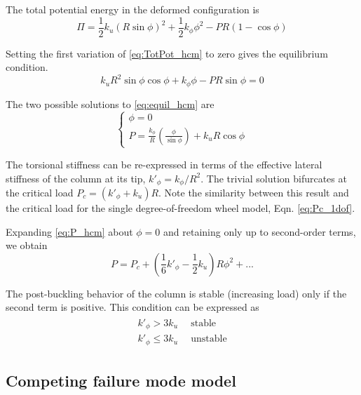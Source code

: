 \documentclass[\rootdir/thesis.tex]{subfiles}
\begin{document}
The total potential energy in the deformed configuration is
\begin{equation}
\label{eq:TotPot_hcm}
\Pi = \frac{1}{2}k_u(R\sin{\phi})^2 + \frac{1}{2}k_{\phi}\phi^2
    - PR(1-\cos{\phi})
\end{equation}

Setting the first variation of \eqref{eq:TotPot_hcm} to zero gives the equilibrium condition.
\begin{equation}
\label{eq:equil_hcm}
k_u R^2 \sin{\phi}\cos{\phi} + k_{\phi}\phi - PR\sin{\phi} = 0
\end{equation}

The two possible solutions to \eqref{eq:equil_hcm} are
\begin{equation}
\label{eq:P_hcm}
\begin{cases}
\phi = 0\\
P = \frac{k_{\phi}}{R}\left(\frac{\phi}{\sin{\phi}}\right) + k_u R\cos{\phi}
\end{cases}
\end{equation}

The torsional stiffness can be re-expressed in terms of the effective lateral stiffness of the column at its tip, $k'_{\phi}=k_{\phi}/R^2$. The trivial solution bifurcates at the critical load $P_c=(k'_{\phi} + k_u) R$. Note the similarity between this result and the critical load for the single degree-of-freedom wheel model, Eqn. \eqref{eq:Pc_1dof}.

Expanding \eqref{eq:P_hcm} about $\phi=0$ and retaining only up to second-order terms, we obtain
\begin{equation}
\label{eq:P_series_hcm}
P = P_c + \left(\frac{1}{6}k'_{\phi} - \frac{1}{2}k_u\right)R\phi^2 + ...
\end{equation}

The post-buckling behavior of the column is stable (increasing load) only if the second term is positive. This condition can be expressed as
\begin{align}
\begin{split}
\label{eq:pb_stability_hcm}
k'_{\phi} > 3k_u & \,\,\,\text{stable}\\
k'_{\phi} \leq 3k_u & \,\,\,\text{unstable}
\end{split}
\end{align}

\subsection{Competing failure mode model}
\end{document}
